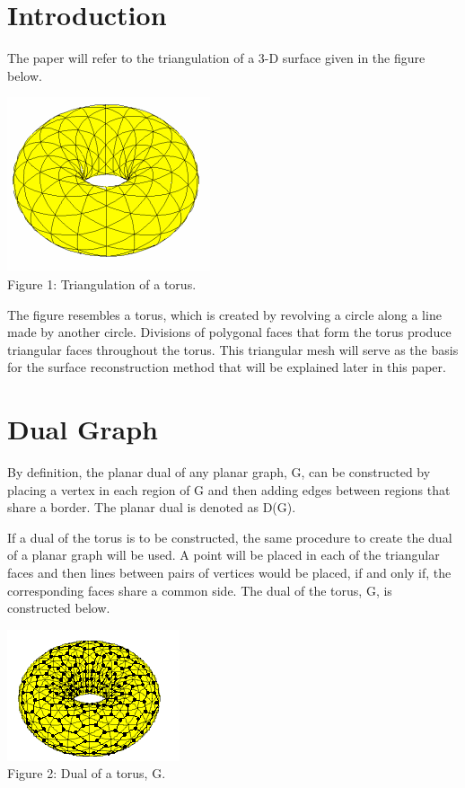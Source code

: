 \documentclass[12pt]{article}
\begin{document}
\begin{flushleft}
\section*{Introduction}
The paper will refer to the triangulation of a 3-D surface given in the figure below.

\begin{center}
\includegraphics[scale=1]{images/torus.png}\\
Figure 1: Triangulation of a torus.
\end{center}

The figure resembles a torus, which is created by revolving a circle along a line made by another circle. Divisions of polygonal faces that form the torus produce triangular faces throughout the torus. This triangular mesh will serve as the basis for the surface reconstruction method that will be explained later in this paper.

\section*{Dual Graph}
By definition, the planar dual of any planar graph, G, can be constructed by placing a vertex in each region of G and then adding edges between regions that share a border. The planar dual is denoted as D(G).

\medskip
If a dual of the torus is to be constructed, the same procedure to create the dual of a planar graph will be used. A point will be placed in each of the triangular faces and then lines between pairs of vertices would be placed, if and only if, the corresponding faces share a common side. The dual of the torus, G, is constructed below.

\begin{center}
\includegraphics[scale=1.25]{images/torusdual.png}\\
Figure 2: Dual of a torus, G.
\end{center}


\end{flushleft}
\end{document}
